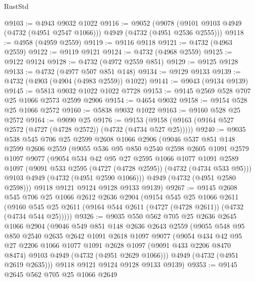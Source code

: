 \begin{lexlean}{RustStd}
\begin{coremodule}
@9103 := @4943 @9032 @1022
@9116 := @9052
    (@9078 (@9101 @9103 @4949 (@4732 (@4951 @2547 @1066))) @4949 (@4732 (@4951 @2536 @2555)))
@9118 := @4958 (@4959 @2559)
@9119 := @9116 @9118
@9121 := @4732 (@4963 @2559)
@9122 := @9119 @9121
@9124 := @4732 (@4968 @2559)
@9125 := @9122 @9124
@9128 := @4732 (@4972 @2559 @851)
@9129 := @9125 @9128
@9133 := @4732 (@4977 @507 @851 @148)
@9134 := @9129 @9133
@9139 := @4732 (@4903 (@4904 (@4983 @2559)) @1022)
@9141 := @9043 (@9134 @9139)
@9145 := @5813 @9032 @1022 @1022 @7728
@9153 := @9145 @2569 @528 @707 @25 @1066 @2573 @2599 @2906
@9154 := @4654 @9032
@9158 := @9154 @528 @25 @1066 @2572
@9160 := @5838 @9032 @1022
@9163 := @9160 @528 @25 @2572
@9164 := @9090 @25
@9176 := @9153 (@9158 (@9163 (@9164 @527 @2572 (@4727 (@4728 @2572)) (@4732 (@4734 @527 @25)))))
@9240 := @9035
    @538
    @545
    @706
    @25
    @2599
    @2608
    @1066
    @2906
    (@9046
      @537
      @851
      @148
      @2599
      @2606
      @2559
      (@9055
        @536
        @95
        @850
        @2540
        @2598
        @2605
        @1091
        @2579
        @1097
        @9077
        (@9054
          @534
          @42
          @95
          @27
          @2595
          @1066
          @1077
          @1091
          @2589
          @1097
          (@9091 @533 @2595 (@4727 (@4728 @2595)) (@4732 (@4734 @533 @95)))
          @9103
          @4949
          (@4732 (@4951 @2590 @1066)))
        @4949
        (@4732 (@4951 @2580 @2598)))
      @9118
      @9121
      @9124
      @9128
      @9133
      @9139)
@9267 := @9145
    @2608
    @545
    @706
    @25
    @1066
    @2612
    @2636
    @2904
    (@9154
      @545
      @25
      @1066
      @2611
      (@9160 @545 @25 @2611 (@9164 @544 @2611 (@4727 (@4728 @2611)) (@4732 (@4734 @544 @25)))))
@9326 := @9035
    @550
    @562
    @705
    @25
    @2636
    @2645
    @1066
    @2904
    (@9046
      @549
      @851
      @148
      @2636
      @2643
      @2559
      (@9055
        @548
        @95
        @850
        @2540
        @2635
        @2642
        @1091
        @2618
        @1097
        @9077
        (@9054
          @434
          @42
          @95
          @27
          @2206
          @1066
          @1077
          @1091
          @2628
          @1097
          (@9091 @433 @2206 @8470 @8474)
          @9103
          @4949
          (@4732 (@4951 @2629 @1066)))
        @4949
        (@4732 (@4951 @2619 @2635)))
      @9118
      @9121
      @9124
      @9128
      @9133
      @9139)
@9353 := @9145
    @2645
    @562
    @705
    @25
    @1066
    @2649

\end{coremodule}
\end{lexlean}
